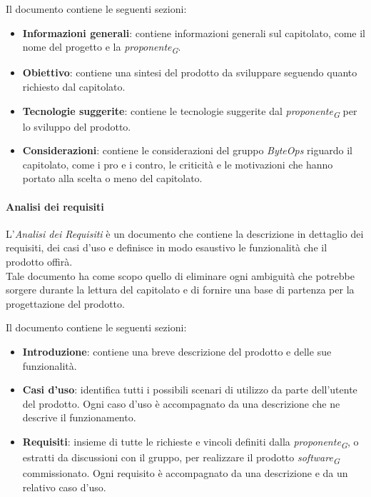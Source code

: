 Il documento contiene le seguenti sezioni:
\begin{itemize}
    \item \textbf{Informazioni generali}: contiene informazioni generali sul capitolato, come il nome del progetto e la \textit{proponente}\textsubscript{\textit{G}}.
    \item \textbf{Obiettivo}: contiene una sintesi del prodotto da sviluppare seguendo quanto richiesto dal capitolato.
    \item \textbf{Tecnologie suggerite}: contiene le tecnologie suggerite dal \textit{proponente}\textsubscript{\textit{G}} per lo sviluppo del prodotto.
    \item \textbf{Considerazioni}: contiene le considerazioni del gruppo \textit{ByteOps} riguardo il capitolato, come i pro e i contro, le criticità e le motivazioni che hanno portato alla scelta o meno del capitolato.
\end{itemize}

\paragraph{Analisi dei requisiti}
L'\textit{Analisi dei Requisiti} è un documento che contiene la descrizione in dettaglio dei requisiti, dei casi d'uso e definisce in modo esaustivo le funzionalità che il prodotto offirà.\\
Tale documento ha come scopo quello di eliminare ogni ambiguità che potrebbe sorgere durante la lettura del capitolato e di fornire una base di partenza per la progettazione del prodotto.

Il documento contiene le seguenti sezioni:

\begin{itemize}
    \item \textbf{Introduzione}: contiene una breve descrizione del prodotto e delle sue funzionalità.
    \item \textbf{Casi d'uso}: identifica tutti i possibili scenari di utilizzo da parte dell'utente del prodotto. Ogni caso d'uso è accompagnato da una descrizione che ne descrive il funzionamento.
    \item \textbf{Requisiti}: insieme di tutte le richieste e vincoli definiti dalla \textit{proponente}\textsubscript{\textit{G}}, o estratti da discussioni con il gruppo, per realizzare il prodotto \textit{software}\textsubscript{\textit{G}} commissionato. Ogni requisito è accompagnato da una descrizione e da un relativo caso d'uso. 
\end{itemize}

